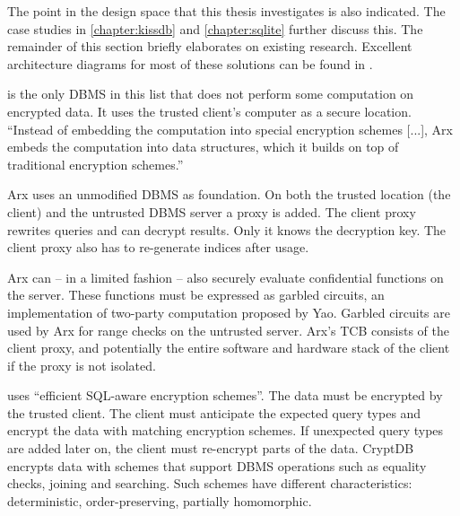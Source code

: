 The point in the design space that this thesis investigates is also indicated.\label{ID_791945182}
The case studies in \autoref{chapter:kissdb} and \autoref{chapter:sqlite} further discuss this.\label{ID_248688756}
The remainder of this section briefly elaborates on existing research.\label{ID_478832158}
Excellent architecture diagrams for most of these solutions can be found in \cite{querying-encrypted-data-tutorial}.\label{ID_1905988012}

\begin{description}\label{ID_646716782}
\item[Arx\cite{Poddar2016}]\label{ID_1305008836}
is the only DBMS in this list that does not perform some computation on encrypted data. It uses the trusted client's computer as a secure location.\label{ID_218675816}
``Instead of embedding the computation into special encryption schemes [...], Arx embeds the computation into data structures, which it builds on top of traditional encryption schemes.''\label{ID_1810283777}

Arx uses an unmodified DBMS as foundation.\label{ID_1501645944}
On both the trusted location (the client) and the untrusted DBMS server a proxy is added.\label{ID_181179976}
The client proxy rewrites queries and can decrypt results. Only it knows the decryption key.\label{ID_1628922594}
The client proxy also has to re-generate indices after usage.\label{ID_1034338418}

Arx can -- in a limited fashion -- also securely evaluate confidential functions on the server.\label{ID_758950797}
These functions must be expressed as garbled circuits, an implementation of two-party computation proposed by Yao.\cite[]{Yao1986}\label{ID_369324288}
Garbled circuits are used by Arx for range checks on the untrusted server.\label{ID_606573027}
Arx's TCB consists of the client proxy, and potentially the entire software and hardware stack of the client if the proxy is not isolated.\label{ID_1089626477}
\item[CryptDB\cite{Popa2011}]\label{ID_78821}
uses ``efficient SQL-aware encryption schemes''.\label{ID_1009585069}
The data must be encrypted by the trusted client.\label{ID_1835736177}
The client must anticipate the expected query types and encrypt the data with matching encryption schemes.\label{ID_623960988}
If unexpected query types are added later on, the client must re-encrypt parts of the data.\label{ID_1748715462}
CryptDB encrypts data with schemes that support DBMS operations such as equality checks, joining and searching.\label{ID_405779956}
Such schemes have different characteristics: deterministic, order-preserving, partially homomorphic.\label{ID_1499466117}


\end{description}
